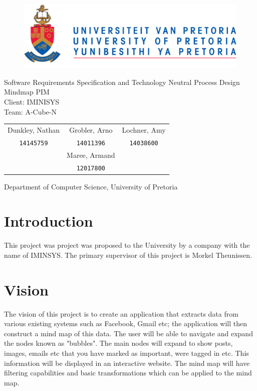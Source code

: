 \documentclass[hidelinks,english]{article}
\date{\today}
\begin{document}
	
	\begin{titlepage}
		\begin{figure}[!t]
			\includegraphics[width=\linewidth]{up_logo.png}
		\end{figure}
		\begin{center}
			\huge{Software Requirements Specification and Technology Neutral Process Design\\}
			\huge{Mindmap PIM}\\
			\large{Client: IMINISYS}\\
			\vspace{10mm}
			\huge{Team: A-Cube-N}\\
		\end{center}
		\begin{center}
			\begin{tabular}{ c c c }
				Dunkley, Nathan & Grobler, Arno & Lochner, Amy \\
				\texttt{14145759} & \texttt{14011396} & \texttt{14038600}\\
				& Maree, Armand &\\
				& \texttt{12017800} &
			\end{tabular}
		\end{center}
		\begin{center}
			Department of Computer Science, University of Pretoria
		\end{center}
	\end{titlepage}
	\newpage
	\tableofcontents
	\newpage
	
	\section{Introduction}
	This project was project was proposed to the University by a company with the name of IMINSYS. The primary supervisor of this project is Morkel Theunissen.
	
	
	\section{Vision}
	The vision of this project is to create an application that extracts data from various existing systems such as Facebook, Gmail etc; the application will then construct a mind map of this data. The user will be able to navigate and expand the nodes known as "bubbles". The main nodes will expand to show posts, images, emails etc that you have marked as important, were tagged in etc. This information will be displayed in an interactive website. The mind map will have filtering capabilities and basic transformations which can be applied to the mind map.
	
\end{document}
